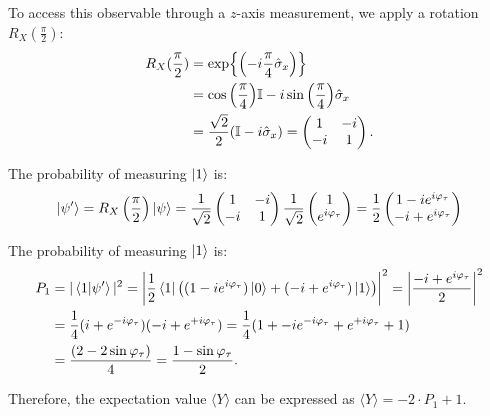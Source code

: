 To access this observable through a $z$-axis measurement, we apply a rotation $R_X(\frac{\pi}{2})$:
\begin{align}\label{eq:RX90}
    R_X(\frac{\pi}{2}) &= \exp{\left( -i\frac{\pi}{4}\hat{\sigma}_x\right)}\\
    &= \cos{\left(\frac{\pi}{4}\right)}\mathbb{I} - i\sin{\left(\frac{\pi}{4}\right)}\hat{\sigma}_x\\
    &= \frac{\sqrt{2}}{2}(\mathbb{I} -i\hat{\sigma}_x) = \begin{pmatrix}
        1 & -i \\
        -i & 1
        \end{pmatrix}.
\end{align}

The probability of measuring $\ket{1}$ is:
\begin{equation}
    \ket{\psi'} = R_X\left(\frac{\pi}{2}\right) \ket{\psi} = \frac{1}{\sqrt{2}} 
\begin{pmatrix}
1 & -i \\
-i & 1
\end{pmatrix}
\frac{1}{\sqrt{2}} 
\begin{pmatrix}
1\\
e^{i\varphi_\tau}
\end{pmatrix}
= \frac{1}{2}
\begin{pmatrix}
1 - ie^{i\varphi_\tau} \\
-i + e^{i\varphi_\tau}
\end{pmatrix}
\end{equation}

The probability of measuring $\ket{1}$ is:
\begin{align}
    P_1 &= |\braket{1 | \psi'}|^2 = \left| \frac{1}{2} \bra{1} \left( (1 - ie^{i\varphi_\tau})\ket{0} + (-i + e^{i\varphi_\tau})\ket{1} \right) \right|^2 = \left| \frac{-i + e^{i\varphi_\tau}}{2} \right|^2\\
        &= \frac{1}{4} (i+e^{-i\varphi_\tau})(-i+e^{+i\varphi_\tau}) = \frac{1}{4}(1 + -ie^{-i\varphi_\tau} + e^{+i\varphi_\tau} +1)\\ 
        &=\frac{(2- 2\sin{\varphi_\tau})}{4} = \frac{1 -\sin{\varphi_\tau}}{2}.
\end{align}

Therefore, the expectation value $\langle Y \rangle$ can be expressed as $\langle Y \rangle =- 2\cdot P_1 + 1$.

